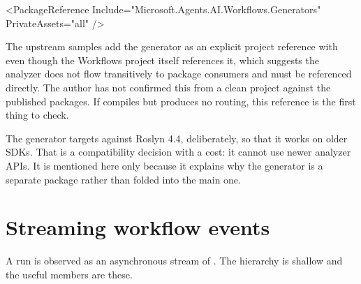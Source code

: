 \begin{xmlcode}[caption={Adding the generator}, label={lst:wf-generator-ref}]
<PackageReference Include="Microsoft.Agents.AI.Workflows.Generators"
                  PrivateAssets="all" />
\end{xmlcode}

\begin{verifybox}
The upstream samples add the generator as an explicit project reference with
 even though the Workflows project itself
references it, which suggests the analyzer does not flow transitively to package
consumers and must be referenced directly. The author has not confirmed this from
a clean  project against the published packages. If
\code{[MessageHandler]} compiles but produces no routing, this reference is the
first thing to check.
\end{verifybox}

\begin{note}
The generator targets  against Roslyn 4.4, deliberately, so
that it works on older SDKs. That is a compatibility decision with a cost: it
cannot use newer analyzer APIs. It is mentioned here only because it explains why
the generator is a separate package rather than folded into the main one.
\end{note}

\section{Streaming workflow events}
\label{sec:wf-events}

A run is observed as an asynchronous stream of . The hierarchy
is shallow and the useful members are these.

